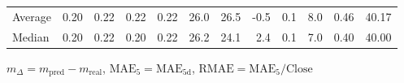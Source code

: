 \begin{threeparttable}
{\begin{tabular}{lrrrrrrrrrrr}
Average &          0.20 &          0.22 &          0.22 &        0.22 &                26.0 &                26.5 &       -0.5 &                 0.1 &              8.0 &            0.46 &                  40.17 \\
 Median &          0.20 &          0.22 &          0.20 &        0.22 &                26.2 &                24.1 &        2.4 &                 0.1 &              7.0 &            0.40 &                  40.00 \\
\bottomrule
\end{tabular}
}
\begin{tablenotes}\footnotesize
\item $m_\Delta=m_{\text{pred}}-m_{\text{real}}$,
$\mathrm{MAE}_5=\mathrm{MAE}_{5\text{d}}$,
$\mathrm{RMAE}=\mathrm{MAE}_5/\text{Close}$
\end{tablenotes}
\end{threeparttable}
\endgroup

